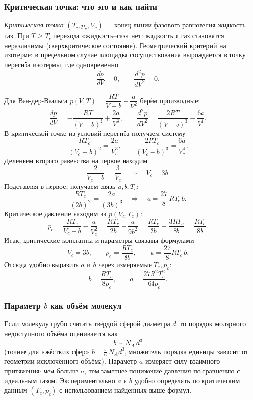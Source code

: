 \documentclass[12pt, a4paper]{article}%
\begin{document}
\subsubsection*{Критическая точка: что это и как найти}
\textit{Критическая точка} \((T_c,p_c,V_c)\) — конец линии фазового равновесия жидкость–газ. При \(T\ge T_c\) перехода «жидкость–газ» нет: жидкость и газ становятся неразличимы (сверхкритическое состояние). Геометрический критерий на изотерме: в предельном случае площадка сосуществования вырождается в точку перегиба изотермы, где одновременно
\[
\frac{dp}{dV}=0,\qquad
\frac{d^2 p}{d V^2}=0.
\]

Для Ван-дер-Ваальса \(p(V,T)=\dfrac{RT}{V-b}-\dfrac{a}{V^2}\) берём производные:
\[
\frac{d p}{d V}=-\frac{RT}{(V-b)^2}+\frac{2a}{V^3},\qquad
\frac{d^2 p}{d V^2}=\frac{2RT}{(V-b)^3}-\frac{6a}{V^4}.
\]
В критической точке из условий перегиба получаем систему
\[
\frac{RT_c}{(V_c-b)^2}=\frac{2a}{V_c^3},\qquad
\frac{2RT_c}{(V_c-b)^3}=\frac{6a}{V_c^4}.
\]
Делением второго равенства на первое находим
\[
\frac{2}{V_c-b}=\frac{3}{V_c}\quad\Longrightarrow\quad V_c=3b.
\]
Подставляя в первое, получаем связь \(a,b,T_c\):
\[
\frac{RT_c}{(2b)^2}=\frac{2a}{(3b)^3}\quad\Longrightarrow\quad a=\frac{27}{8}\,RT_c\,b.
\]
Критическое давление находим из \(p(V_c,T_c)\):
\[
p_c=\frac{RT_c}{V_c-b}-\frac{a}{V_c^2}=\frac{RT_c}{2b}-\frac{a}{9b^2}
=\frac{RT_c}{2b}-\frac{3RT_c}{8b}=\frac{RT_c}{8b}.
\]
Итак, критические константы и параметры связаны формулами
\[
V_c=3b,\qquad p_c=\frac{RT_c}{8b},\qquad a=\frac{27}{8}RT_c\,b.
\]
Отсюда удобно выразить \(a\) и \(b\) через измеряемые \(T_c,p_c\):
\[
\boxed{b=\frac{RT_c}{8p_c},\qquad a=\frac{27R^2T_c^2}{64p_c}.}
\]

\subsubsection*{Параметр $b$ как объём молекул}
Если молекулу грубо считать твёрдой сферой диаметра \(d\), то порядок молярного недоступного объёма оценивается как
\[
b\sim N_A\,d^3
\]
(точнее для «жёстких сфер» \(b=\frac{\pi}{6}\,N_Ad^3\), множитель порядка единицы зависит от геометрии исключённого объёма). 
Параметр \(a\) измеряет силу взаимного притяжения: чем больше \(a\), тем заметнее понижение давления по сравнению с идеальным газом. Экспериментально \(a\) и \(b\) удобно определять по критическим данным \((T_c,p_c)\) с использованием найденных выше формул.
\end{document}
